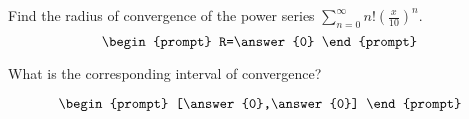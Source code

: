 \documentclass{ximera}
\author{Gregory Hartman \and Matthew Carr}
\begin{document}
\begin{exercise}




Find the radius of convergence of the power series $\sum_{n=0}^{\infty}n!\left(\frac{x}{10}\right)^n$.
\[
\begin{prompt}
R=\answer{0}
\end{prompt}
\]

What is the corresponding interval of convergence?

\[
\begin{prompt}
[\answer{0},\answer{0}]
\end{prompt}
\]

\end{exercise}
\end{document}
